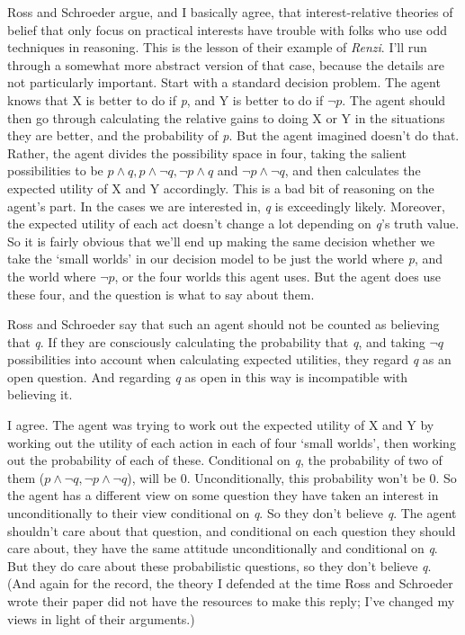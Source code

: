 \documentclass[11pt,]{book}
\begin{document}
Ross and Schroeder argue, and I basically agree, that interest-relative theories of belief that only focus on practical interests have trouble with folks who use odd techniques in reasoning. This is the lesson of their example of \emph{Renzi}. I'll run through a somewhat more abstract version of that case, because the details are not particularly important. Start with a standard decision problem. The agent knows that X is better to do if \emph{p}, and Y is better to do if \(\neg p\). The agent should then go through calculating the relative gains to doing X or Y in the situations they are better, and the probability of \emph{p}. But the agent imagined doesn't do that. Rather, the agent divides the possibility space in four, taking the salient possibilities to be
\(p \wedge q, p \wedge \neg q, \neg p \wedge q\) and \(\neg p \wedge \neg q\), and then calculates the expected utility of X and Y accordingly. This is a bad bit of reasoning on the agent's part. In the cases we are interested in, \emph{q} is exceedingly likely. Moreover, the expected utility of each act doesn't change a lot depending on \emph{q}'s truth value. So it is fairly obvious that we'll end up making the same decision whether we take the `small worlds' in our decision model to be just the world where \emph{p}, and the world where \(\neg p\), or the four worlds this agent uses. But the agent does use these four, and the question is what to say about them.

Ross and Schroeder say that such an agent should not be counted as believing that \emph{q}. If they are consciously calculating the probability that \emph{q}, and taking \(\neg q\) possibilities into account when calculating expected utilities, they regard \emph{q} as an open question. And regarding \emph{q} as open in this way is incompatible with believing it.

I agree. The agent was trying to work out the expected utility of X and Y by working out the utility of each action in each of four `small worlds', then working out the probability of each of these. Conditional on \emph{q}, the probability of two of them (\(p \wedge \neg q, \neg p \wedge \neg q\)), will be 0. Unconditionally, this probability won't be 0. So the agent has a different view on some question they have taken an interest in unconditionally to their view conditional on \emph{q}. So they don't believe \emph{q}. The agent shouldn't care about that question, and conditional on each question they should care about, they have the same attitude unconditionally and conditional on \emph{q}. But they do care about these probabilistic questions, so they don't believe \emph{q}. (And again for the record, the theory I defended at the time Ross and Schroeder wrote their paper did not have the resources to make this reply; I've changed my views in light of their arguments.)
\end{document}

